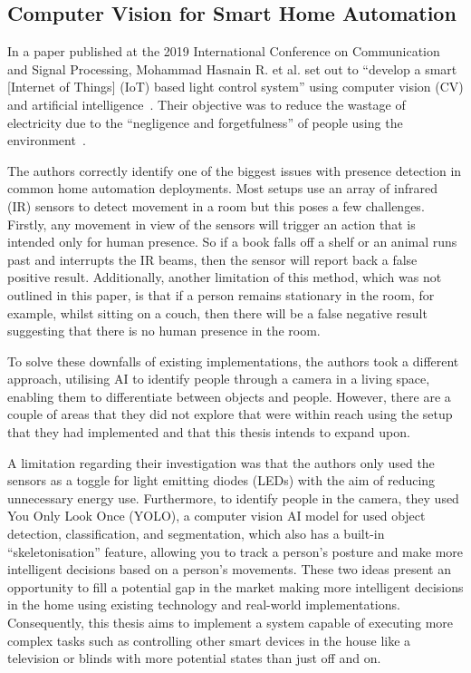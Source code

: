 \subsection{Computer Vision for Smart Home Automation}
In a paper published at the 2019 International Conference on Communication and Signal Processing, Mohammad Hasnain R. et al. set out to ``develop a smart [Internet of Things] (IoT) based light control system'' using computer vision (CV) and artificial intelligence~\cite{Hasn19}.
Their objective was to reduce the wastage of electricity due to the ``negligence and forgetfulness'' of people using the environment~\cite{Hasn19}.

The authors correctly identify one of the biggest issues with presence detection in common home automation deployments.
Most setups use an array of infrared (IR) sensors to detect movement in a room but this poses a few challenges.
Firstly, any movement in view of the sensors will trigger an action that is intended only for human presence.
So if a book falls off a shelf or an animal runs past and interrupts the IR beams, then the sensor will report back a false positive result.
Additionally, another limitation of this method, which was not outlined in this paper, is that if a person remains stationary in the room, for example, whilst sitting on a couch, then there will be a false negative result suggesting that there is no human presence in the room.

To solve these downfalls of existing implementations, the authors took a different approach, utilising AI to identify people through a camera in a living space, enabling them to differentiate between objects and people.
However, there are a couple of areas that they did not explore that were within reach using the setup that they had implemented and that this thesis intends to expand upon.

A limitation regarding their investigation was that the authors only used the sensors as a toggle for light emitting diodes (LEDs) with the aim of reducing unnecessary energy use.
Furthermore, to identify people in the camera, they used You Only Look Once (YOLO), a computer vision AI model for used object detection, classification, and segmentation, which also has a built-in ``skeletonisation'' feature, allowing you to track a person's posture and make more intelligent decisions based on a person's movements.
These two ideas present an opportunity to fill a potential gap in the market making more intelligent decisions in the home using existing technology and real-world implementations.
Consequently, this thesis aims to implement a system capable of executing more complex tasks such as controlling other smart devices in the house like a television or blinds with more potential states than just off and on.

